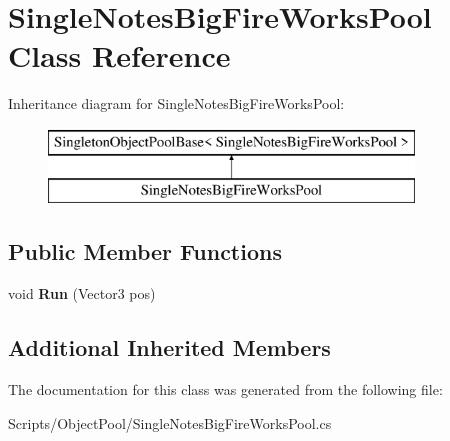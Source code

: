 \hypertarget{class_single_notes_big_fire_works_pool}{}\section{Single\+Notes\+Big\+Fire\+Works\+Pool Class Reference}
\label{class_single_notes_big_fire_works_pool}
Inheritance diagram for Single\+Notes\+Big\+Fire\+Works\+Pool\+:\begin{figure}[H]
\begin{center}
\leavevmode
\includegraphics[height=2.000000cm]{class_single_notes_big_fire_works_pool}
\end{center}
\end{figure}
\subsection*{Public Member Functions}
\begin{DoxyCompactItemize}
\item 
void {\bfseries Run} (Vector3 pos)\hypertarget{class_single_notes_big_fire_works_pool_af8554599e8fb1d2f6e44d01af20b7b60}{}\label{class_single_notes_big_fire_works_pool_af8554599e8fb1d2f6e44d01af20b7b60}

\end{DoxyCompactItemize}
\subsection*{Additional Inherited Members}


The documentation for this class was generated from the following file\+:\begin{DoxyCompactItemize}
\item 
Scripts/\+Object\+Pool/Single\+Notes\+Big\+Fire\+Works\+Pool.\+cs\end{DoxyCompactItemize}
